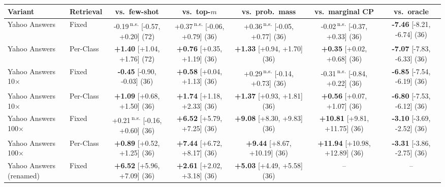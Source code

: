 \begin{tabular}{llccccc}
\toprule
Variant & Retrieval & vs.\ few-shot & vs.\ top-$m$ & vs.\ prob.\ mass & vs.\ marginal CP & vs.\ oracle \\
\midrule
Yahoo Answers & Fixed & -0.19\,\textsuperscript{n.s.} {\scriptsize [-0.57, +0.20]} (72) & +0.37\,\textsuperscript{n.s.} {\scriptsize [-0.06, +0.79]} (36) & +0.36\,\textsuperscript{n.s.} {\scriptsize [-0.05, +0.77]} (36) & -0.02\,\textsuperscript{n.s.} {\scriptsize [-0.37, +0.33]} (36) & \textbf{-7.46} {\scriptsize [-8.21, -6.74]} (36) \\
Yahoo Answers & Per-Class & \textbf{+1.40} {\scriptsize [+1.04, +1.76]} (72) & \textbf{+0.76} {\scriptsize [+0.35, +1.19]} (36) & \textbf{+1.33} {\scriptsize [+0.94, +1.70]} (36) & \textbf{+0.35} {\scriptsize [+0.02, +0.68]} (36) & \textbf{-7.07} {\scriptsize [-7.83, -6.33]} (36) \\
Yahoo Answers 10$\times$ & Fixed & \textbf{-0.45} {\scriptsize [-0.90, -0.03]} (36) & \textbf{+0.58} {\scriptsize [+0.04, +1.13]} (36) & +0.29\,\textsuperscript{n.s.} {\scriptsize [-0.14, +0.73]} (36) & -0.31\,\textsuperscript{n.s.} {\scriptsize [-0.84, +0.22]} (36) & \textbf{-6.85} {\scriptsize [-7.54, -6.19]} (36) \\
Yahoo Answers 10$\times$ & Per-Class & \textbf{+1.09} {\scriptsize [+0.68, +1.50]} (36) & \textbf{+1.74} {\scriptsize [+1.18, +2.33]} (36) & \textbf{+1.37} {\scriptsize [+0.93, +1.81]} (36) & \textbf{+0.56} {\scriptsize [+0.07, +1.07]} (36) & \textbf{-6.80} {\scriptsize [-7.53, -6.12]} (36) \\
Yahoo Answers 100$\times$ & Fixed & +0.21\,\textsuperscript{n.s.} {\scriptsize [-0.16, +0.60]} (36) & \textbf{+6.52} {\scriptsize [+5.79, +7.25]} (36) & \textbf{+9.08} {\scriptsize [+8.30, +9.83]} (36) & \textbf{+10.81} {\scriptsize [+9.81, +11.75]} (36) & \textbf{-3.10} {\scriptsize [-3.69, -2.52]} (36) \\
Yahoo Answers 100$\times$ & Per-Class & \textbf{+0.89} {\scriptsize [+0.52, +1.25]} (36) & \textbf{+7.44} {\scriptsize [+6.72, +8.17]} (36) & \textbf{+9.44} {\scriptsize [+8.67, +10.19]} (36) & \textbf{+11.94} {\scriptsize [+10.98, +12.89]} (36) & \textbf{-3.31} {\scriptsize [-3.86, -2.75]} (36) \\
Yahoo Answers (renamed) & Fixed & \textbf{+6.52} {\scriptsize [+5.96, +7.09]} (36) & \textbf{+2.61} {\scriptsize [+2.02, +3.18]} (36) & \textbf{+5.03} {\scriptsize [+4.49, +5.58]} (36) & -- & -- \\

\end{tabular}
